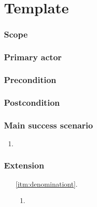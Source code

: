 \section{Template}\label{subsec:usecase_template}

\subsubsection{Scope}

\subsubsection{Primary actor}

\subsubsection{Precondition}

\subsubsection{Postcondition}

\subsubsection{Main success scenario}
\begin{enumerate}
	\item \label{itm:denomination} 
\end{enumerate}
\subsubsection{Extension}
\begin{enumerate}
	\item[\ref{itm:denominationt}.]
	\begin{enumerate}[i]
		\item 
	\end{enumerate}
\end{enumerate}

